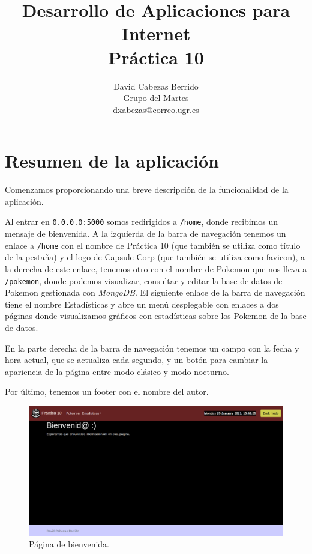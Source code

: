 \documentclass{article}
\title{\Huge Desarrollo de Aplicaciones para Internet \\ Práctica 10 \vspace{10mm}}
\author{\huge David Cabezas Berrido \vspace{10mm} \\ 
  \huge Grupo del Martes \vspace{10mm} \\ \huge dxabezas@correo.ugr.es \vspace{10mm}}
\begin{document}
\maketitle
\pagebreak
\tableofcontents
\pagebreak

\section{Resumen de la aplicación}
Comenzamos proporcionando una breve descripción de la funcionalidad de la aplicación.

Al entrar en \texttt{0.0.0.0:5000} somos redirigidos a \texttt{/home},
donde recibimos un mensaje de bienvenida. A la izquierda de la barra
de navegación tenemos un enlace a \texttt{/home} con el nombre de
Práctica 10 (que también se utiliza como título de la pestaña) y el
logo de Capsule-Corp (que también se utiliza como favicon), a la
derecha de este enlace, tenemos otro con el nombre de Pokemon que nos
lleva a \texttt{/pokemon}, donde podemos visualizar, consultar y
editar la base de datos de Pokemon gestionada con \textit{MongoDB}. El siguiente
enlace de la barra de navegación tiene el nombre Estadísticas y abre
un menú desplegable con enlaces a dos páginas donde visualizamos
gráficos con estadísticas sobre los Pokemon de la base de datos.

En la parte derecha de la barra de navegación tenemos un campo con la
fecha y hora actual, que se actualiza cada segundo, y un botón para
cambiar la apariencia de la página entre modo clásico y modo nocturno.

Por último, tenemos un footer con el nombre del autor.

\begin{figure}[H]
  \centering
  \includegraphics[width=180mm]{imgs/home}
  \caption{Página de bienvenida.}
  \label{fig:home}
\end{figure}
\end{document}
